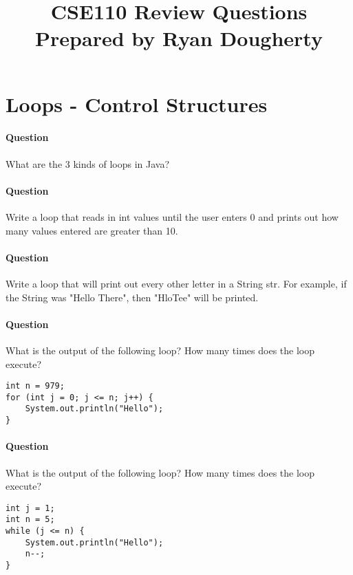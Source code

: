 \documentclass{article}
\date{}
\begin{document}
\title{\textbf{CSE110 Review Questions \\
Prepared by Ryan Dougherty}}
\maketitle

\section*{Loops - Control Structures}

\setcounter{question_num}{1}
\paragraph{Question }
What are the 3 kinds of loops in Java?

\addtocounter{question_num}{1}
\paragraph{Question }
Write a loop that reads in int values until the user enters 0 and prints out how many values entered are greater than 10.

\addtocounter{question_num}{1}
\paragraph{Question }
Write a loop that will print out every other letter in a String str. For example, if the String was "Hello There", then "HloTee" will be printed.

\addtocounter{question_num}{1}
\paragraph{Question }
What is the output of the following loop? How many times does the loop execute?
\begin{lstlisting}
int n = 979;
for (int j = 0; j <= n; j++) {
	System.out.println("Hello");
}
\end{lstlisting}

\addtocounter{question_num}{1}
\paragraph{Question }
What is the output of the following loop? How many times does the loop execute?
\begin{lstlisting}
int j = 1;
int n = 5;
while (j <= n) {
	System.out.println("Hello");
	n--;
}
\end{lstlisting}
\end{document}
